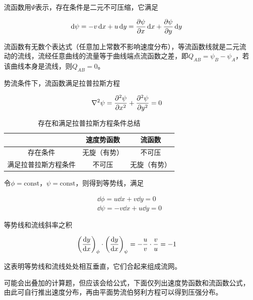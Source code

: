
流函数用$\varPsi$表示，存在条件是二元不可压缩，它满足

\begin{equation}
	\dd{\psi} = -v\dd{x} + u\dd{y} = \pdv{\psi}{x} \dd{x} + \pdv{\psi}{y} \dd{y}
\end{equation}

流函数有无数个表达式（任意加上常数不影响速度分布），等流函数线就是二元流动的流线，流经任意曲线的流量等于曲线端点流函数之差，即$Q_{AB} = \psi_{B} - \psi_{A}$，若该曲线本身是流线，则$Q_{AB} = 0$。

势流条件下，流函数满足拉普拉斯方程

\begin{equation}
	\nabla^2 \psi = \pdv[2]{\psi}{x} + \pdv[2]{\psi}{y} = 0
\end{equation}

\begin{table}[H]
	\centering
	\begin{tabular}{ccc}
		\toprule[1pt]
		 & 速度势函数 & 流函数 \\
		 \hline
		存在条件 & 无旋（有势） & 不可压 \\
		\hline
		满足拉普拉斯方程条件 & 不可压 & 无旋（有势）\\
		\bottomrule[1pt]
	\end{tabular}
    \caption{存在和满足拉普拉斯方程条件总结}
\end{table}


令$\phi = \text{const}$，$\psi = \text{const}$，则得到等势线，满足

\begin{equation}
	\begin{split}
		&\dd{\phi} = u\dd{x} + v\dd{y} = 0\\
		&\dd{\psi} = -v\dd{x} + u\dd{y} = 0
	\end{split}
\end{equation}

等势线和流线斜率之积

\begin{equation*}
	\qty(\dv{y}{x})_{\phi} \cdot \qty(\dv{y}{x})_{\psi} = -\dfrac{u}{v} \cdot \dfrac{v}{u} = -1
\end{equation*}

这表明等势线和流线处处相互垂直，它们合起来组成流网。


\begin{tip}
	可能会出叠加的计算题，但应该会给公式，下面仅列出速度势函数和流函数公式，由此可自行推出速度分布，再由平面势流伯努利方程可以得到压强分布。
\end{tip}

